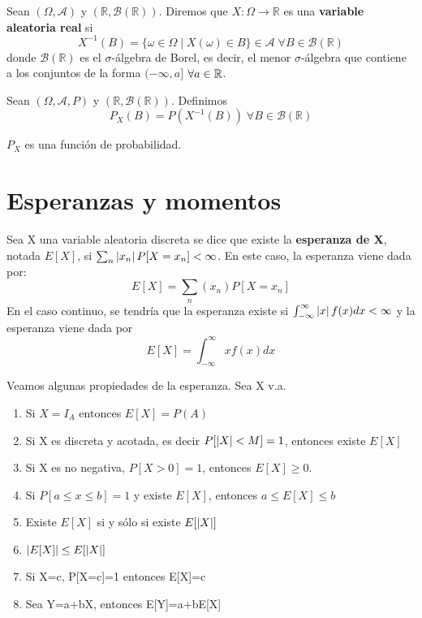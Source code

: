 \documentclass[PREyA.tex]{subfiles}
\begin{document}
\begin{defi}Sean $(\Omega,\mathscr{A})$ y $(\mathbb{R},\mathcal{B}(\mathbb{R}))$. Diremos que $X: \Omega \rightarrow \mathbb{R}$ es una \textbf{variable aleatoria real} si 
\begin{equation*}
X^{-1}(B)=\{\omega\in\Omega\;|\;X(\omega)\in B\}\in\mathscr{A}\;\forall B\in \mathcal{B}(\mathbb{R})
\end{equation*}
donde $\mathcal{B}(\mathbb{R})$ es el $\sigma$-álgebra de Borel, es decir, el menor $\sigma$-álgebra que contiene a los conjuntos de la forma $(-\infty,a]$ $\forall a \in \mathbb{R}$.
\end{defi}

\begin{defi}
Sean $(\Omega,\mathscr{A},P)$ y $(\mathbb{R},\mathcal{B}(\mathbb{R}))$. Definimos
\begin{equation*}
P_X(B)=P(X^{-1}(B)) \; \forall B \in \mathcal{B}(\mathbb{R})
\end{equation*}
\end{defi}
\begin{prop}$P_X$ es una funci\'on de probabilidad.
\end{prop}

\section{Esperanzas y momentos}

\begin{defi}Sea X una variable aleatoria discreta se dice que existe la \textbf{esperanza de X}, notada $E[X]$, si $\sum_n \left\lvert x_n\right\rvert P[X=x_n]<\infty$. En este caso, la esperanza viene dada por:
\begin{equation*}
E[X]=\sum_n (x_n)P[X=x_n]
\end{equation*}
En el caso continuo, se tendr\'ia que la esperanza existe  si $\int_{-\infty}^{\infty}\left\lvert x\right\rvert f(x)dx <\infty$ y la esperanza viene dada por
\begin{equation*}
E[X]=\int_{-\infty}^{\infty}xf(x)dx
\end{equation*}
\end{defi}

\begin{prop}Veamos algunas propiedades de la esperanza. Sea X v.a.
\begin{enumerate}
\item Si $X=I_A$ entonces $E[X]=P(A)$
\item Si X es discreta y acotada, es decir $P[\left\lvert X\right\rvert<M]=1$, entonces existe $E[X]$
\item Si X es no negativa, $P[X>0]=1$, entonces $E[X]\geq 0$.
\item Si $P[a\leq x \leq b]=1$ y existe $E[X]$, entonces $a\leq E[X] \leq b$
\item Existe $E[X]$ si y s\'olo si existe $E[\left\lvert X\right\rvert]$
\item $\left\lvert E[X]\right\rvert\leq E[\left\lvert X\right\rvert]$
\item Si X=c, P[X=c]=1 entonces E[X]=c
\item Sea Y=a+bX, entonces E[Y]=a+bE[X]
\end{enumerate}
\end{prop}
\newpage
\end{document}
